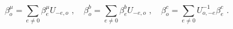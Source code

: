 \begin{equation}
\beta _{o}^{\mu }=\sum_{e\neq 0}\beta _{e}^{\mu }U_{-e,o}\,\,,
\quad\beta
_{o}^{b}=\sum_{e\neq 0}\beta _{e}^{b}U_{-e,o}\,\,,\quad\beta
_{o}^{c}=\sum_{e\neq 0}U_{o,-e}^{-1}\beta _{e}^{c}\,\,.
\end{equation}%
